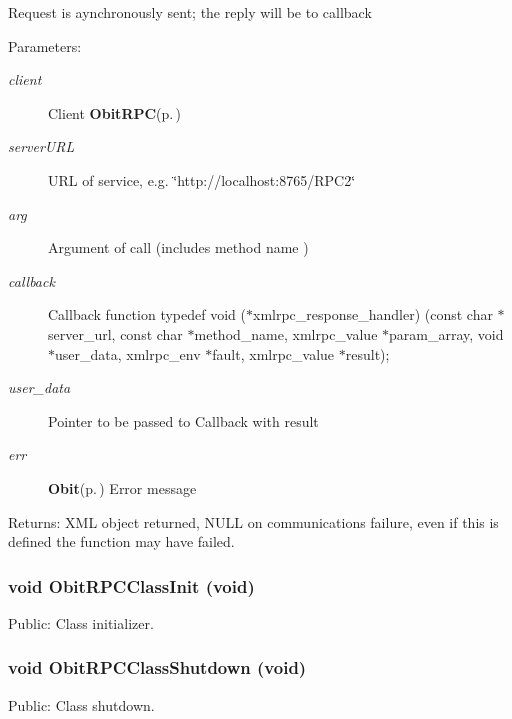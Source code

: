 Request is aynchronously sent; the reply will be to callback \begin{Desc}
\item[Parameters:]
\begin{description}
\item[{\em client}]Client {\bf Obit\-RPC}{\rm (p.\,\pageref{structObitRPC})} \item[{\em server\-URL}]URL of service, e.g. \char`\"{}http://localhost:8765/RPC2\char`\"{} \item[{\em arg}]Argument of call (includes method name ) \item[{\em callback}]Callback function typedef void ($\ast$xmlrpc\_\-response\_\-handler) (const char $\ast$server\_\-url, const char $\ast$method\_\-name, xmlrpc\_\-value $\ast$param\_\-array, void $\ast$user\_\-data, xmlrpc\_\-env $\ast$fault, xmlrpc\_\-value $\ast$result); \item[{\em user\_\-data}]Pointer to be passed to Callback with result \item[{\em err}]{\bf Obit}{\rm (p.\,\pageref{structObit})} Error message \end{description}
\end{Desc}
\begin{Desc}
\item[Returns:]XML object returned, NULL on communications failure, even if this is defined the function may have failed. \end{Desc}
\subsubsection{\setlength{\rightskip}{0pt plus 5cm}void Obit\-RPCClass\-Init (void)}\label{ObitRPC_8c_a17}


Public: Class initializer. 

\subsubsection{\setlength{\rightskip}{0pt plus 5cm}void Obit\-RPCClass\-Shutdown (void)}\label{ObitRPC_8c_a18}


Public: Class shutdown. 

